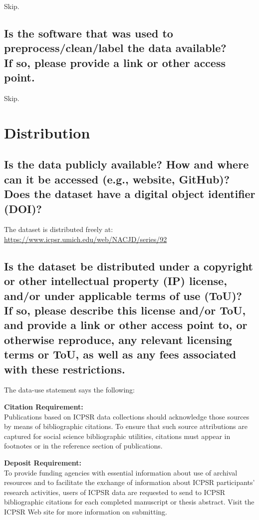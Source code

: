 \documentclass[letterpaper, 10 pt, conference]{ieeeconf}  %
\newcommand{\subtitle}[1]{{\\ \small \normalfont \color{purple} #1}}
\begin{document}
Skip.

\subsection{Is the software that was used to preprocess/clean/label the data available? \subtitle{If so, please provide a link or other access point.}}

Skip.

\section{Distribution}

\subsection{Is the data publicly available? How and where can it be accessed (e.g., website, GitHub)? \subtitle{Does the dataset have a digital object identifier (DOI)?}}

The dataset is distributed freely at: \href{https://www.icpsr.umich.edu/web/NACJD/series/92}{https://www.icpsr.umich.edu/web/NACJD/series/92}


\subsection{Is the dataset be distributed under a copyright or other intellectual property (IP) license, and/or under applicable terms of use (ToU)? \subtitle{If so, please describe this license and/or ToU, and provide a link or other access point to, or otherwise reproduce, any relevant licensing terms or ToU, as well as any fees associated with these restrictions.}}

The data-use statement says the following:

\textbf{Citation Requirement:} \\
Publications based on ICPSR data collections should acknowledge those sources by means of bibliographic citations. To ensure that such source attributions are captured for social science bibliographic utilities, citations must appear in footnotes or in the reference section of publications.

\textbf{Deposit Requirement:} \\ 
To provide funding agencies with essential information about use of archival resources and to facilitate the exchange of information about ICPSR participants' research activities, users of ICPSR data are requested to send to ICPSR bibliographic citations for each completed manuscript or thesis abstract. Visit the ICPSR Web site for more information on submitting.
\end{document}
